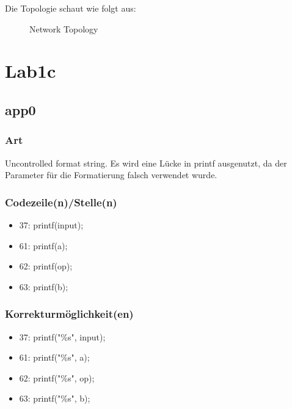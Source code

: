 \documentclass[12pt,a4paper,titlepage,oneside]{scrartcl}
\begin{document}
Die Topologie schaut wie folgt aus:
\begin{figure}[h!]
  \centering
  \caption{Network Topology}
  \label{fig:logo1}
\end{figure}

\newpage

\section{Lab1c}

\subsection{app0}

\subsubsection{Art}
\noindent
Uncontrolled format string. Es wird eine Lücke in printf ausgenutzt, da der Parameter für die Formatierung falsch verwendet wurde.

\subsubsection{Codezeile(n)/Stelle(n)}
\noindent
\begin{itemize}  
\item 37: printf(input);
\item 61: printf(a);
\item 62: printf(op);
\item 63: printf(b);
\end{itemize}

\subsubsection{Korrekturmöglichkeit(en)}
\noindent
\begin{itemize}  
\item 37: printf("\%s", input);
\item 61: printf("\%s", a);
\item 62: printf("\%s", op);
\item 63: printf("\%s", b);
\end{itemize}
\end{document}
